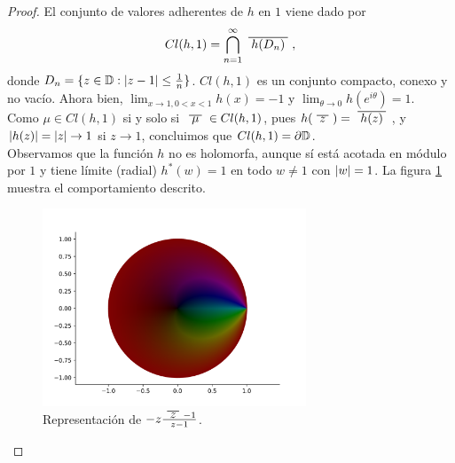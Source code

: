 \begin{proof}
    El conjunto de valores adherentes de $h$ en $1$ viene dado por
    \begin{equation*}
        Cl(h,1) = \bigcap_{n=1}^{\infty} \xbar{h(D_n)},
    \end{equation*}
    donde $D_n = \{z \in \mathbb{D} : \left\lvert z-1\right\rvert \leq \frac{1}{n}\}$. $Cl(h,1)$ es un conjunto compacto, conexo y no vacío. Ahora bien, $\lim_{x \to 1, 0 < x < 1} h(x) = -1$ y $\lim_{\theta \to 0} h(e^{i \theta}) = 1$. \\

    Como $\mu \in Cl(h,1)$ si y solo si $\xbar{\mu} \in Cl(h,1)$, pues $h(\xbar{z}) = \xbar{h(z)}$, y $\left\lvert h(z)\right\rvert = \left\lvert z\right\rvert \to 1$ si $z \to 1$, concluimos que $Cl(h,1) = \partial \mathbb{D}$. \\

    Observamos que la función $h$ no es holomorfa, aunque sí está acotada en módulo por $1$ y tiene límite (radial) $h^*(w) = 1$ en todo $w\neq 1$ con $\left\lvert w\right\rvert = 1$. La figura \ref{fig:h(z)} muestra el comportamiento descrito. \\

    \begin{figure}[!htbp]
        \centering
        \includegraphics[width=0.7\textwidth]{../Aplicacion/h(z).png}
        \caption{Representación de $-z \frac{\xbar{z} -1}{z - 1}$.}
        \label{fig:h(z)}
    \end{figure}

\end{proof}
